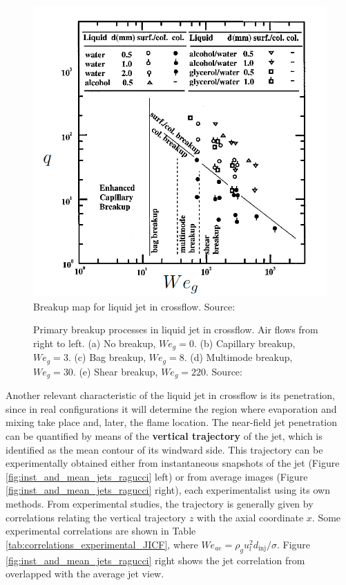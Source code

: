 \begin{figure}[h!]
	\centering
	\includegraphics[scale=0.55]{./part0_intro/jicf_breakup_regime_wu}
	\caption{Breakup map for liquid jet in crossflow. Source: \citeColor[wu_breakup_1997]}
	\label{fig:jicf_breakup_regime_wu}
\end{figure}

\begin{figure}[h!]
	\centering
	\caption[Primary breakup processes in liquid jet in crossflow]{Primary breakup processes in liquid jet in crossflow. Air flows from right to left. (a) No breakup, $We_g = 0$. (b) Capillary breakup, $We_g = 3$. (c) Bag breakup, $We_g = 8$. (d) Multimode breakup, $We_g = 30$. (e) Shear breakup, $We_g = 220$. Source: }
	\label{fig:jicf_breakup_sallam}
\end{figure}

Another relevant characteristic of the liquid jet in crossflow is its penetration, since in real configurations it will determine the region where evaporation and mixing take place and, later, the flame location. The near-field jet penetration can be quantified by means of the \textbf{vertical trajectory} of the jet, which is identified as the mean contour of its windward side. This trajectory can be experimentally obtained either from instantaneous snapshots of the jet (Figure \ref{fig:inst_and_mean_jets_ragucci} left) or from average images (Figure \ref{fig:inst_and_mean_jets_ragucci} right), each experimentalist using its own methods. From experimental studies, the trajectory is generally given by correlations relating the vertical trajectory $z$ with the axial coordinate $x$. Some experimental correlations are shown in Table \ref{tab:correlations_experimental_JICF}, where $We_{ae} = \rho_g u_l^2 d_\mathrm{inj}/\sigma$. Figure \ref{fig:inst_and_mean_jets_ragucci} right shows the jet correlation from  overlapped with the average jet view.


